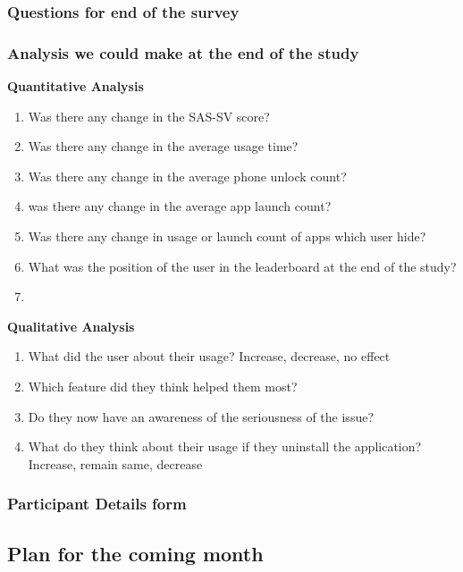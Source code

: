 \documentclass{article}
\begin{document}
\subsubsection{Questions for end of the survey}


\subsubsection{Analysis we could make at the end of the study}

\textbf{Quantitative Analysis}
\begin{enumerate}
    \item Was there any change in the SAS-SV score?
    \item Was there any change in the average usage time?
    \item Was there any change in the average phone unlock count?
    \item was there any change in the average app launch count?
    \item Was there any change in usage or launch count of apps which user hide?
    \item What was the position of the user in the leaderboard at the end of the study?
    \item 
\end{enumerate}

\textbf{Qualitative Analysis}
\begin{enumerate}
    \item What did the user about their usage? Increase, decrease, no effect
    \item Which feature did they think helped them most?
    \item Do they now have an awareness of the seriousness of the issue? 
    \item What do they think about their usage if they uninstall the application? Increase, remain same, decrease
\end{enumerate}


\subsubsection{Participant Details form}



\subsection{Plan for the coming month}
\end{document}
